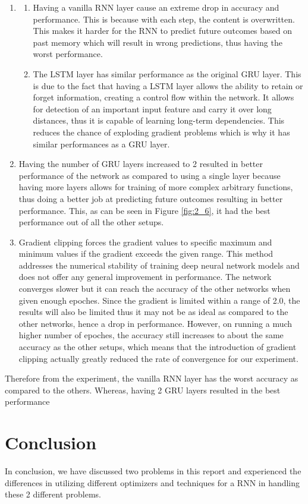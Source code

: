 \begin{enumerate}[label=(\alph*)]
    \item 
    \begin{enumerate}[label=(\roman*)]
        \item Having a vanilla RNN layer cause an extreme drop in accuracy and performance. This is because with each step, the content is overwritten. This makes it harder for the RNN to predict future outcomes based on past memory which will result in wrong predictions, thus having the worst performance.

        \item The LSTM layer has similar performance as the original GRU layer. This is due to the fact that having a LSTM layer allows the ability to retain or forget information, creating a control flow within the network. It allows for detection of an important input feature and carry it over long distances, thus it is capable of learning long-term dependencies. This reduces the chance of exploding gradient problems which is why it has similar performances as a GRU layer.
    \end{enumerate}
    
    \item Having the number of GRU layers increased to 2 resulted in better performance of the network as compared to using a single layer because having more layers allows for training of more complex arbitrary functions, thus doing a better job at predicting future outcomes resulting in better performance. This, as can be seen in Figure \ref{fig:2_6}, it had the best performance out of all the other setups.
    
    \item Gradient clipping forces the gradient values to specific maximum and minimum values if the gradient exceeds the given range. This method addresses the numerical stability of training deep neural network models and does not offer any general improvement in performance. The network converges slower but it can reach the accuracy of the other networks when given enough epoches. Since the gradient is limited within a range of 2.0, the results will also be limited thus it may not be as ideal as compared to the other networks, hence a drop in performance. However, on running a much higher number of epoches, the accuracy still increases to about the same accuracy as the other setups, which means that the introduction of gradient clipping actually greatly reduced the rate of convergence for our experiment.
\end{enumerate}

Therefore from the experiment, the vanilla RNN layer has the worst accuracy as compared to the others. Whereas, having 2 GRU layers resulted in the best performance

\section{Conclusion}
In conclusion, we have discussed two problems in this report and experienced the differences in utilizing different optimizers and techniques for a RNN in handling these 2 different problems.